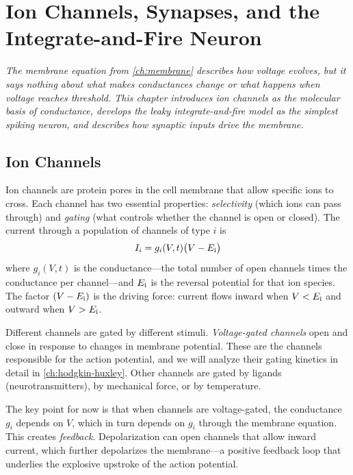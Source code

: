 \chapter{Ion Channels, Synapses, and the Integrate-and-Fire Neuron}
\label{ch:lif}

\textit{The membrane equation from \cref{ch:membrane} describes how voltage evolves, but it says nothing about what makes conductances change or what happens when voltage reaches threshold. This chapter introduces ion channels as the molecular basis of conductance, develops the leaky integrate-and-fire model as the simplest spiking neuron, and describes how synaptic inputs drive the membrane.}

\section{Ion Channels}
\label{sec:ion-channels}

Ion channels are protein pores in the cell membrane that allow specific ions to cross. Each channel has two essential properties: \emph{selectivity} (which ions can pass through) and \emph{gating} (what controls whether the channel is open or closed). The current through a population of channels of type $i$ is
%
\begin{equation}
  I_i = g_i(V, t)\bigl(V - E_{\mathrm{i}}\bigr)
  \label{eq:channel-current}
\end{equation}
%
where $g_i(V, t)$ is the conductance---the total number of open channels times the conductance per channel---and $E_{\mathrm{i}}$ is the reversal potential for that ion species. The factor $(V - E_{\mathrm{i}})$ is the driving force: current flows inward when $V < E_{\mathrm{i}}$ and outward when $V > E_{\mathrm{i}}$.

Different channels are gated by different stimuli. \emph{Voltage-gated channels} open and close in response to changes in membrane potential. These are the channels responsible for the action potential, and we will analyze their gating kinetics in detail in \cref{ch:hodgkin-huxley}. Other channels are gated by ligands (neurotransmitters), by mechanical force, or by temperature.

The key point for now is that when channels are voltage-gated, the conductance $g_i$ depends on $V$, which in turn depends on $g_i$ through the membrane equation. This creates \emph{feedback}. Depolarization can open channels that allow inward current, which further depolarizes the membrane---a positive feedback loop that underlies the explosive upstroke of the action potential.

